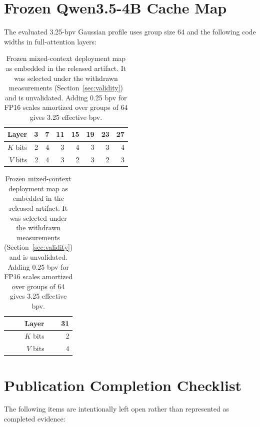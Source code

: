 \documentclass[10pt,twocolumn]{article}
\begin{document}



\appendix

\section{Frozen Qwen3.5-4B Cache Map}

The evaluated 3.25-bpv Gaussian profile uses group size 64 and the following
code widths in full-attention layers:

\begin{table}[h]
\centering
\small
\begin{tabular}{rrrrrrrr}
\toprule
Layer & 3 & 7 & 11 & 15 & 19 & 23 & 27 \\
\midrule
$K$ bits & 2 & 4 & 3 & 4 & 3 & 3 & 4 \\
$V$ bits & 2 & 4 & 3 & 2 & 3 & 2 & 3 \\
\bottomrule
\end{tabular}

\vspace{4pt}

\begin{tabular}{rr}
\toprule
Layer & 31 \\
\midrule
$K$ bits & 2 \\
$V$ bits & 4 \\
\bottomrule
\end{tabular}
\caption{Frozen mixed-context deployment map as embedded in the released
artifact. It was selected under the withdrawn measurements
(Section~\ref{sec:validity}) and is unvalidated. Adding 0.25 bpv for FP16
scales amortized over groups of 64 gives 3.25 effective bpv.}
\end{table}

\section{Publication Completion Checklist}

The following items are intentionally left open rather than represented as
completed evidence:
\end{document}
